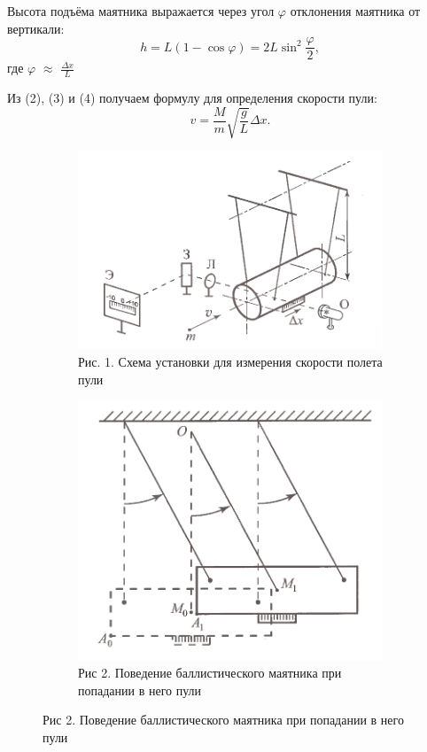 \documentclass[
	a4paper, %
	12pt, %
]{article}
\renewcommand {\phi}{\varphi}
\begin{document}
	Высота подъёма маятника выражается через угол $\phi$ отклонения маятника от вертикали:
	\begin{equation}
		h = L(1 - \cos{\phi}) = 2L\sin^2{\frac{\phi}{2}},
	\end{equation}
	где $\phi$ $\approx$ $\frac{\Delta x}{L}$
	
	Из (2), (3) и (4) получаем формулу для определения скорости пули:
	\begin{equation}
		v = \frac{M}{m}\sqrt{\frac{g}{L}}\Delta x.
	\end{equation}
	
	
	\begin{figure}[h]
		
		\begin{subfigure}{0.5\textwidth}
			\includegraphics[width=0.9\linewidth]{1.png} 
			\caption{Рис. 1. Схема установки для измерения скорости полета пули}
			\label{fig:subim1}
		\end{subfigure}
		\begin{subfigure}{0.5\textwidth}
			\includegraphics[width=0.9\linewidth]{2.png}
			\caption{Рис 2. Поведение баллистического маятника при попадании в него пули}
			\label{fig:subim2}
		\end{subfigure}
		
	\end{figure}
	
\end{document}
